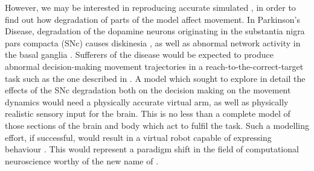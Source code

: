 \documentclass{frontiersSCNS}
\begin{document}
However, we may be interested in reproducing accurate
simulated , in order to find out how degradation of
parts of the model affect movement. In Parkinson's Disease,
degradation of the dopamine neurons originating in the substantia
nigra pars compacta (SNc) causes
diskinesia \citep{galvan_pathophysiology_2008}, as well as abnormal
network activity in the basal
ganglia \citep{brown_dopamine_2001,mccarthy_striatal_2011}.  Sufferers
of the disease would be expected to produce abnormal
decision-making  movement trajectories in a
reach-to-the-correct-target task such as the one described in
\cite{james_target-distractor_2017}.
%
A model which sought to explore in detail the effects of the SNc
degradation both on the decision making  on the movement
dynamics would need a physically accurate virtual arm, as well as
physically realistic sensory input for the brain. This is no less than
a complete model of those sections of the brain and body which act to
fulfil the task. Such a modelling effort, if successful, would result
in a virtual robot capable of expressing behaviour . This would represent a paradigm
shift in the field of computational neuroscience worthy of the new
name of .
\end{document}

